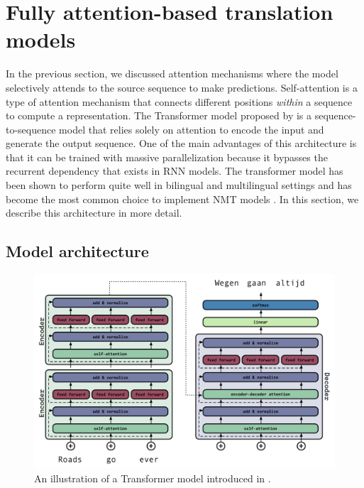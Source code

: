 \section{Fully attention-based translation models} \label{TRNN}

In the previous section, we discussed attention mechanisms where the model selectively attends to the source sequence to make predictions. 
Self-attention is a type of attention mechanism that connects different positions \textit{within} a sequence to compute a representation.
The Transformer model proposed by \citet{vaswani2017attention} is a sequence-to-sequence model that relies solely on attention to encode the input and generate the output sequence. 
One of the main advantages of this architecture is that it can be trained with massive parallelization because it bypasses the recurrent dependency that exists in RNN models.  
The transformer model has been shown to perform quite well in bilingual and multilingual settings \citep{lakew-etal-2018-comparison} and has become the most common choice to implement NMT models \citep{edunov-etal-2018-understanding,aharoni-etal-2019-massively}.
In this section, we describe this architecture in more detail.

\subsection{Model architecture}


\begin{figure}
\centering
\includegraphics[width=0.95\linewidth]{02-background/figs/trnarc.pdf}
\caption{An illustration of a Transformer model introduced in \citet{vaswani2017attention}.}
\label{bgTRNfig}
\end{figure}

